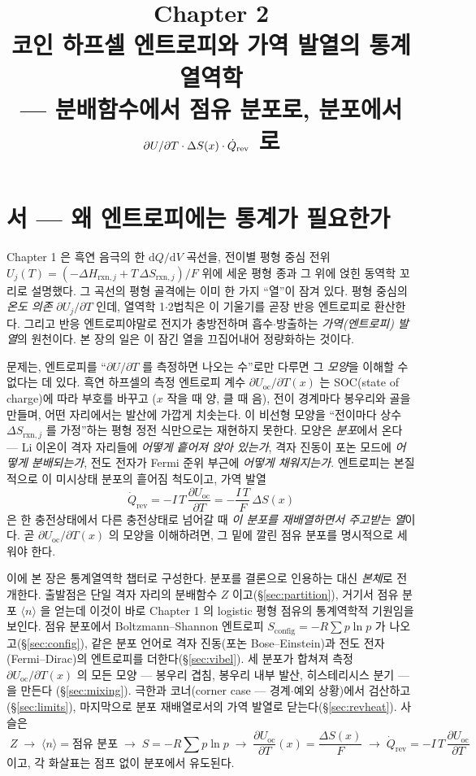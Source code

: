 \documentclass[11pt,a4paper]{article}
\title{\textbf{\LARGE Chapter 2}\\[0.35em]\Large 코인 하프셀 엔트로피와 가역 발열의 통계열역학\\[0.2em]\large — 분배함수에서 점유 분포로, 분포에서 $\partial U/\partial T\cdot\Delta S(x)\cdot\dot Q_\rev$ 로}
\author{}\date{}
\newcommand{\dd}{\mathrm{d}}
\newcommand{\rxn}{\mathrm{rxn}}
\newcommand{\rev}{\mathrm{rev}}
\newcommand{\oc}{\mathrm{oc}}
\newcommand{\config}{\mathrm{config}}
\newcommand{\avg}[1]{\langle #1\rangle}
\begin{document}
\maketitle

\section*{서 — 왜 엔트로피에는 통계가 필요한가}
Chapter 1 은 흑연 음극의 한 $\dd Q/\dd V$ 곡선을, 전이별 평형 중심 전위
$U_j(T)=(-\Delta H_{\rxn,j}+T\,\Delta S_{\rxn,j})/F$ 위에 세운 평형 종과 그 위에 얹힌 동역학 꼬리로
설명했다. 그 곡선의 평형 골격에는 이미 한 가지 ``열''이 잠겨 있다. 평형 중심의 \emph{온도 의존}
$\partial U_j/\partial T$ 인데, 열역학 1$\cdot$2법칙은 이 기울기를 곧장 반응 엔트로피로 환산한다. 그리고
반응 엔트로피야말로 전지가 충방전하며 흡수$\cdot$방출하는 \emph{가역(엔트로피) 발열}의 원천이다. 본 장의
일은 이 잠긴 열을 끄집어내어 정량화하는 것이다.

문제는, 엔트로피를 ``$\partial U/\partial T$ 를 측정하면 나오는 수''로만 다루면 그 \emph{모양}을 이해할 수
없다는 데 있다. 흑연 하프셀의 측정 엔트로피 계수 $\partial U_\oc/\partial T(x)$ 는 SOC(state of charge)에 따라 부호를 바꾸고
($x$ 작을 때 양, 클 때 음), 전이 경계마다 봉우리와 골을 만들며, 어떤 자리에서는 발산에 가깝게 치솟는다. 이
비선형 모양을 ``전이마다 상수 $\Delta S_{\rxn,j}$ 를 가정''하는 평형 정전 식만으로는 재현하지 못한다. 모양은
\emph{분포}에서 온다 — Li 이온이 격자 자리들에 \emph{어떻게 흩어져 앉아 있는가}, 격자 진동이 포논 모드에
\emph{어떻게 분배되는가}, 전도 전자가 Fermi 준위 부근에 \emph{어떻게 채워지는가}. 엔트로피는 본질적으로
이 미시상태 분포의 흩어짐 척도이고, 가역 발열
\[
\dot Q_\rev=-I\,T\,\frac{\partial U_\oc}{\partial T}=-\frac{I\,T}{F}\,\Delta S(x)
\]
은 한 충전상태에서 다른 충전상태로 넘어갈 때 \emph{이 분포를 재배열하면서 주고받는 열}이다. 곧
$\partial U_\oc/\partial T(x)$ 의 모양을 이해하려면, 그 밑에 깔린 점유 분포를 명시적으로 세워야 한다.

이에 본 장은 통계열역학 챕터로 구성한다. 분포를 결론으로 인용하는 대신 \emph{본체}로 전개한다. 출발점은 단일 격자
자리의 분배함수 $Z$ 이고(\S\ref{sec:partition}), 거기서 점유 분포 $\avg{n}$ 을 얻는데 이것이 바로 Chapter 1
의 logistic 평형 점유의 통계역학적 기원임을 보인다. 점유 분포에서 Boltzmann--Shannon 엔트로피
$S_\config=-R\sum p\ln p$ 가 나오고(\S\ref{sec:config}), 같은 분포 언어로 격자 진동(포논 Bose--Einstein)과
전도 전자(Fermi--Dirac)의 엔트로피를 더한다(\S\ref{sec:vibel}). 세 분포가 합쳐져 측정 $\partial U_\oc/\partial T(x)$
의 모든 모양 — 봉우리 겹침, 봉우리 내부 발산, 히스테리시스 분기 — 을 만든다
(\S\ref{sec:mixing}). 극한과 코너(corner case — 경계$\cdot$예외 상황)에서 검산하고(\S\ref{sec:limits}), 마지막으로 분포 재배열로서의 가역
발열로 닫는다(\S\ref{sec:revheat}). 사슬은
\[
\boxed{\;Z \;\to\; \avg{n}=\text{점유 분포}\;\to\; S=-R\textstyle\sum p\ln p \;\to\; \frac{\partial U_\oc}{\partial T}(x)=\frac{\Delta S(x)}{F}\;\to\;\dot Q_\rev=-I\,T\,\frac{\partial U_\oc}{\partial T}\;}
\]
이고, 각 화살표는 점프 없이 분포에서 유도된다.
\end{document}
